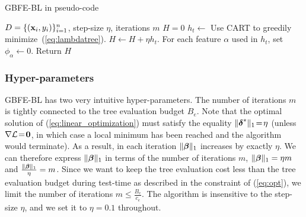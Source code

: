 \begin{algorithm}                      %
\caption{GBFE-BL in pseudo-code}          %
\label{alg:gbrt}                           %
\begin{algorithmic}                    %
\REQUIRE $D=\{(\mathbf{x}_i,y_i)\}_{i=1}^n$, step-size $\eta$, iterations $m$
\STATE $H=0$
    \STATE $h_t\leftarrow$ \textrm{Use CART to greedily minimize~(\ref{eq:lambdatree}}). %
	\STATE $H\leftarrow H+\eta h_{t}$.
	\STATE For each feature $\alpha$ used in $h_t$, set $\phi_\alpha\leftarrow 0$.
\ENDFOR
\STATE Return $H$
\end{algorithmic}
\end{algorithm}

\subsubsection{Hyper-parameters}
GBFE-BL has two very intuitive hyper-parameters. The number of iterations $m$ is tightly connected to the tree evaluation budget $B_e$. Note that the optimal solution of (\ref{eq:linear_optimization}) must satisfy the equality $\|\boldsymbol{\delta}^*\|_1\!=\!\eta$ (unless $\nabla{\cal L}\!=\!\mathbf{0}$, in which case a local minimum has been reached and the algorithm would terminate). As a result, in each iteration $\|\boldsymbol{\beta}\|_1$ increases by exactly $\eta$. %
We can therefore express $\|\boldsymbol{\beta}\|_1$ in terms of the number of iterations $m$, $\|\boldsymbol{\beta}\|_1 = \eta m$ and $\frac{\|\boldsymbol{\beta}\|_1}{\eta} = m$. Since we want to keep the tree evaluation cost less than the tree evaluation budget during test-time as described in the constraint of (\ref{eq:opt}), we limit the number of iterations $m \le \frac{B_e}{c_e}$. %
The algorithm is insensitive to the step-size $\eta$, and we set it to $\eta = 0.1$ throughout.

